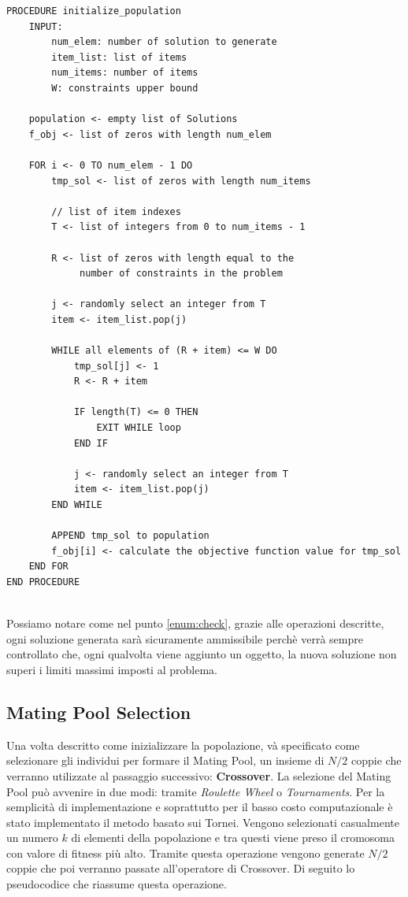 \begin{minipage}{\textwidth}
    \begin{lstlisting}
PROCEDURE initialize_population
    INPUT:
        num_elem: number of solution to generate
        item_list: list of items
        num_items: number of items
        W: constraints upper bound

    population <- empty list of Solutions
    f_obj <- list of zeros with length num_elem

    FOR i <- 0 TO num_elem - 1 DO
        tmp_sol <- list of zeros with length num_items

        // list of item indexes
        T <- list of integers from 0 to num_items - 1

        R <- list of zeros with length equal to the
             number of constraints in the problem

        j <- randomly select an integer from T
        item <- item_list.pop(j)

        WHILE all elements of (R + item) <= W DO
            tmp_sol[j] <- 1
            R <- R + item

            IF length(T) <= 0 THEN
                EXIT WHILE loop
            END IF

            j <- randomly select an integer from T
            item <- item_list.pop(j)
        END WHILE

        APPEND tmp_sol to population
        f_obj[i] <- calculate the objective function value for tmp_sol
    END FOR
END PROCEDURE
\end{lstlisting}
\end{minipage}\\

Possiamo notare come nel punto \ref{enum:check}, grazie alle operazioni
descritte, ogni soluzione generata sarà sicuramente ammissibile perchè verrà
sempre controllato che, ogni qualvolta viene aggiunto un oggetto, la nuova
soluzione non superi i limiti massimi imposti al problema.

\subsection{Mating Pool Selection}
Una volta descritto come inizializzare la popolazione, và specificato come
selezionare gli individui per formare il Mating Pool, un insieme di $N/2$ coppie
che verranno utilizzate al passaggio successivo: \textbf{Crossover}. La
selezione del Mating Pool può avvenire in due modi: tramite \textit{Roulette
    Wheel} o \textit{Tournaments}. Per la semplicità di implementazione e
soprattutto per il basso costo computazionale è stato implementato il metodo
basato sui Tornei. Vengono selezionati casualmente un numero $k$ di elementi
della popolazione e tra questi viene preso il cromosoma con valore di fitness
più alto. Tramite questa operazione vengono generate $N/2$ coppie che poi verranno
passate all'operatore di Crossover.
Di seguito lo pseudocodice che riassume questa operazione.

